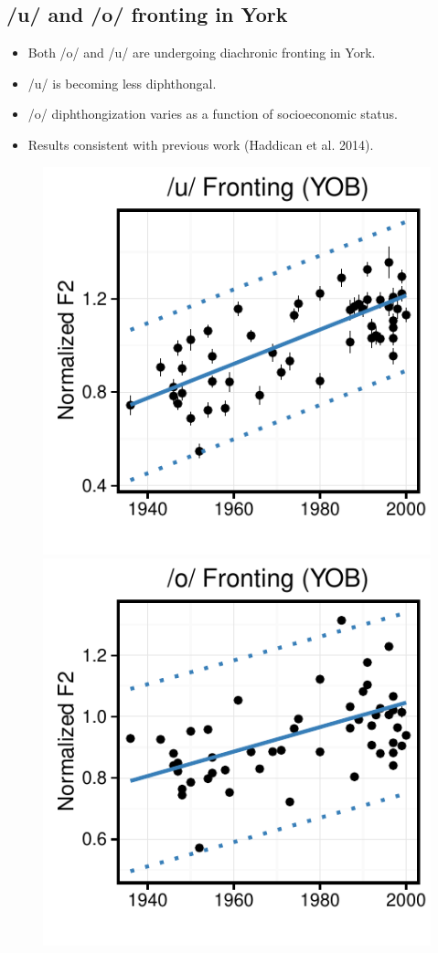 \documentclass[a0,final]{a0poster}
\begin{document}
\begin{multicols}{4}
\section*{/u/ and /o/ fronting in York}
\normalsize
\begin{itemize}
\item{Both /o/ and /u/ are undergoing diachronic fronting in York.}
\item{/u/ is becoming less diphthongal.}
\item{/o/ diphthongization varies as a function of socioeconomic status.}
\item{Results consistent with previous work (Haddican et al. 2014).}
\end{itemize}
\begin{figure}[H]
\centering
\includegraphics[scale=1.65]{u_fronting_yob.pdf}\includegraphics[scale=1.65]{o_fronting_yob.pdf} 

\end{figure}
\end{multicols}
\end{document}
